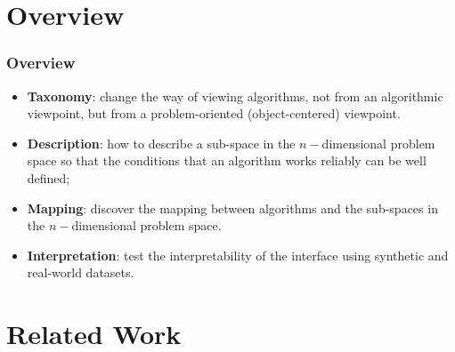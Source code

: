 \documentclass{beamer}
\begin{document}
\section{Overview} %



\begin{frame}
\frametitle{Overview}

\begin{itemize}
\item \textbf{Taxonomy}: change the way of viewing algorithms, not from an algorithmic viewpoint, but from a problem-oriented (object-centered) viewpoint.
\item \textbf{Description}: how to describe a sub-space in the $n-$dimensional problem space so that the conditions that an algorithm works reliably can be well defined;
\item \textbf{Mapping}: discover the mapping between algorithms and the sub-spaces in the $n-$dimensional problem space.
\item \textbf{Interpretation}: test the interpretability of the interface using synthetic and real-world datasets.
\end{itemize}
\end{frame}

\section{Related Work} %

\end{document}
